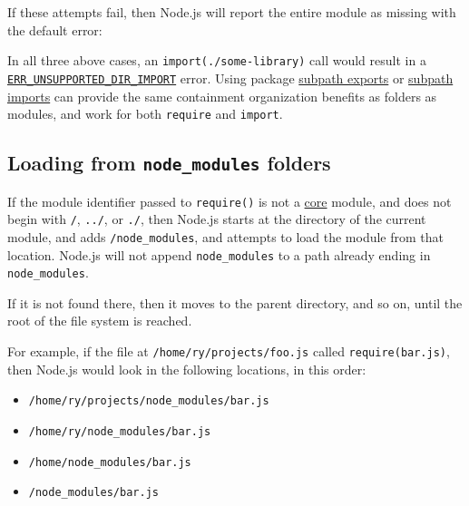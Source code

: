 If these attempts fail, then Node.js will report the entire module as
missing with the default error:

\begin{Shaded}
\begin{Highlighting}[]
\end{Highlighting}
\end{Shaded}

In all three above cases, an
\texttt{import(\textquotesingle{}./some-library\textquotesingle{})} call
would result in a
\href{errors.md\#err_unsupported_dir_import}{\texttt{ERR\_UNSUPPORTED\_DIR\_IMPORT}}
error. Using package \href{packages.md\#subpath-exports}{subpath
exports} or \href{packages.md\#subpath-imports}{subpath imports} can
provide the same containment organization benefits as folders as
modules, and work for both \texttt{require} and \texttt{import}.

\subsection{\texorpdfstring{Loading from \texttt{node\_modules}
folders}{Loading from node\_modules folders}}\label{loading-from-node_modules-folders}

If the module identifier passed to \texttt{require()} is not a
\hyperref[core-modules]{core} module, and does not begin with
\texttt{\textquotesingle{}/\textquotesingle{}},
\texttt{\textquotesingle{}../\textquotesingle{}}, or
\texttt{\textquotesingle{}./\textquotesingle{}}, then Node.js starts at
the directory of the current module, and adds \texttt{/node\_modules},
and attempts to load the module from that location. Node.js will not
append \texttt{node\_modules} to a path already ending in
\texttt{node\_modules}.

If it is not found there, then it moves to the parent directory, and so
on, until the root of the file system is reached.

For example, if the file at
\texttt{\textquotesingle{}/home/ry/projects/foo.js\textquotesingle{}}
called \texttt{require(\textquotesingle{}bar.js\textquotesingle{})},
then Node.js would look in the following locations, in this order:

\begin{itemize}
\tightlist
\item
  \texttt{/home/ry/projects/node\_modules/bar.js}
\item
  \texttt{/home/ry/node\_modules/bar.js}
\item
  \texttt{/home/node\_modules/bar.js}
\item
  \texttt{/node\_modules/bar.js}
\end{itemize}

